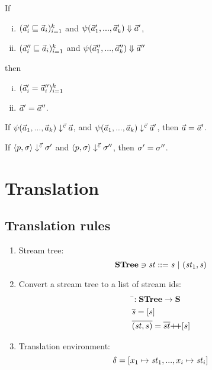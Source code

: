 \begin{lem}
	If
	\begin{enumerate}[(i)]
		\item $(\vec a_i' \sqsubseteq  \vec a_i)^k_{i=1}$ and ${\psi}(\vec a_1',...,\vec a_k') \Downarrow \vec a'$, 
		\item $(\vec a_i'' \sqsubseteq \vec a_i)^k_{i=1}$ and
		${\psi}(\vec a_1'',...,\vec a_k'') \Downarrow \vec a''$
	\end{enumerate} 
	then \begin{enumerate}[(i)]
		\item $(\vec a_i' = \vec a_i'')^k_{i=1}$ 
		\item $\vec a' = \vec a''$.
	\end{enumerate}
\end{lem}

\begin{lem} \label{thm-lcall-determ}
	If $\psi(\vec a_1,...,\vec a_{k}) \downarrow^{\vec c} \vec a$,
	and $\psi(\vec a_1,...,\vec a_{k}) \downarrow^{\vec c} \vec a'$,
	then $\vec a = \vec a'$.
\end{lem}

\begin{thm} \label{thm-svcode-determ}
	If $\left\langle p,\sigma \right\rangle \downarrow^{\vec c} \sigma'$ and $\left\langle p,\sigma \right\rangle \downarrow^{\vec c} \sigma''$, 
	then $\sigma' = \sigma''$.
\end{thm}


\section{Translation}



\subsection{Translation rules}
\begin{enumerate}[(1)]
	\item Stream tree: $$ \STree \ni \st ::= \s \ | \ (\st_1,\s) $$
	\item Convert a stream tree to a list of  stream ids:
	      \begin{align*}
	      &\bar{}: \STree \-> \S \\
	      &\overline{\s} = [s] \\
	      &\overline{(\st,s)} = \overline{st} {\++} [s]
	      \end{align*}

	
	\item Translation environment: $$\del = [x_1 \|-> \st_1,..., x_i \|-> {\st_i}] $$ 
	
	
\end{enumerate}

